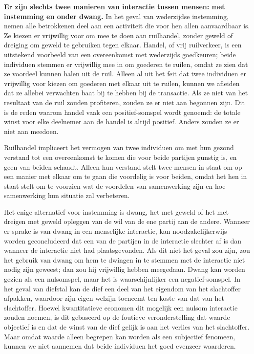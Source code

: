 \textbf{Er zijn slechts twee manieren van interactie tussen mensen: met instemming en onder dwang.} In het geval van wederzijdse instemming, nemen alle betrokkenen deel aan een activiteit die voor hen allen aanvaardbaar is. Ze kiezen er vrijwillig voor om mee te doen aan ruilhandel, zonder geweld of dreiging om geweld te gebruiken tegen elkaar. Handel, of vrij ruilverkeer, is een uitstekend voorbeeld van een overeenkomst met wederzijds goedkeuren; beide individuen stemmen er vrijwillig mee in om goederen te ruilen, omdat ze zien dat ze voordeel kunnen halen uit de ruil. Alleen al uit het feit dat twee individuen er vrijwillig voor kiezen om goederen met elkaar uit te ruilen, kunnen we afleiden dat ze allebei verwachten baat bij te hebben bij de transactie. Als ze niet van het resultaat van de ruil zouden profiteren, zouden ze er niet aan begonnen zijn. Dit is de reden waarom handel vaak een positief-somspel wordt genoemd: de totale winst voor elke deelnemer aan de handel is altijd positief. Anders zouden ze er niet aan meedoen.

Ruilhandel impliceert het vermogen van twee individuen om met hun gezond verstand tot een overeenkomst te komen die voor beide partijen gunstig is, en geen van beiden schaadt. Alleen hun verstand stelt twee mensen in staat om op een manier met elkaar om te gaan die voordelig is voor beiden, omdat het hen in staat stelt om te voorzien wat de voordelen van samenwerking zijn en hoe samenwerking hun situatie zal verbeteren.

Het enige alternatief voor instemming is dwang, het met geweld of het met dreigen met geweld opleggen van de wil van de ene partij aan de andere. Wanneer er sprake is van dwang in een menselijke interactie, kan noodzakelijkerwijs worden geconcludeerd dat een van de partijen in de interactie slechter af is dan wanneer de interactie niet had plaatsgevonden. Als dit niet het geval zou zijn, zou het gebruik van dwang om hem te dwingen in te stemmen met de interactie niet nodig zijn geweest; dan zou hij vrijwillig hebben meegedaan. Dwang kan worden gezien als een nulsomspel, maar het is waarschijnlijker een negatief-somspel. In het geval van diefstal kan de dief een deel van het eigendom van het slachtoffer afpakken, waardoor zijn eigen welzijn toeneemt ten koste van dat van het slachtoffer. Hoewel kwantitatieve economen dit mogelijk een nulsom interactie zouden  noemen, is dit gebaseerd op de foutieve veronderstelling dat waarde objectief is en dat de winst van de dief gelijk is aan het verlies van het slachtoffer. Maar omdat waarde alleen begrepen kan worden als een subjectief fenomeen, kunnen we niet aannemen dat beide individuen het goed evenzeer waarderen.

